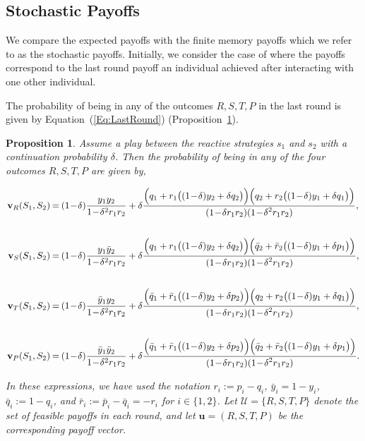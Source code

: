 \documentclass[11pt]{article}
\theoremstyle{plainCl1}
\newtheorem{Prop}{Proposition}
\theoremstyle{plainCl2}
\begin{document}
\subsection*{Stochastic Payoffs}

We compare the expected payoffs with the finite memory payoffs which we refer to
as the stochastic payoffs. Initially, we consider the case of where the payoffs
correspond to the last round payoff an individual achieved after interacting
with one other individual.

The probability of being in any of the outcomes \(R, S, T, P\) in the last round
is given by Equation~(\ref{Eq:LastRound})
(Proposition~\ref{proposition:last_round}).

\begin{Prop}\label{proposition:last_round}
Assume a play between the reactive strategies \(s_1\) and \(s_2\) with a
continuation probability \(\delta\). Then the probability of being in any of the
four outcomes \(R, S, T, P\) are given by,

\begin{equation} \label{Eq:LastRound}
  \setlength{\arraycolsep}{1pt}
  \begin{array}{rcl}

  \mathbf{v}_{R}(S_1,S_2) &= &\displaystyle (1\!-\!\delta)\frac{y_1y_2}{1\!-\!\delta^2 r_1 r_2}+\delta \frac{\Big(q_1+r_1\big((1\!-\!\delta)y_2+\delta q_2\big)\Big) \Big(q_2+r_2\big((1\!-\!\delta)y_1+\delta q_1\big)\Big)}
  {\displaystyle(1\!-\!\delta r_1r_2)(1\!-\!\delta^2 r_1 r_2)},\\[1cm]

  \mathbf{v}_{S}(S_1,S_2) &= &\displaystyle (1\!-\!\delta)\frac{y_1\bar{y}_2}{1\!-\!\delta^2 r_1 r_2}+\delta \frac{\Big(q_1+r_1\big((1\!-\!\delta)y_2+\delta q_2\big)\Big) \Big(\bar{q}_2+\bar{r}_2\big((1\!-\!\delta)y_1+\delta p_1\big)\Big)}
  {\displaystyle(1\!-\!\delta r_1r_2)(1\!-\!\delta^2 r_1 r_2)},\\[1cm]

  \mathbf{v}_{T}(S_1,S_2) &= &\displaystyle (1\!-\!\delta)\frac{\bar{y}_1y_2}{1\!-\!\delta^2 r_1 r_2}+\delta \frac{\Big(\bar{q}_1+\bar{r}_1\big((1\!-\!\delta)y_2+\delta p_2\big)\Big) \Big(q_2+r_2\big((1\!-\!\delta)y_1+\delta q_1\big)\Big)}
  {\displaystyle(1\!-\!\delta r_1r_2)(1\!-\!\delta^2 r_1 r_2)},\\[1cm]

  \mathbf{v}_{P}(S_1,S_2) &= &\displaystyle (1\!-\!\delta)\frac{\bar{y}_1\bar{y}_2}{1\!-\!\delta^2 r_1 r_2}+\delta \frac{\Big(\bar{q}_1+\bar{r}_1\big((1\!-\!\delta)y_2+\delta p_2\big)\Big) \Big(\bar{q}_2+\bar{r}_2\big((1\!-\!\delta)y_1+\delta p_1\big)\Big)}
  {\displaystyle(1\!-\!\delta r_1r_2)(1\!-\!\delta^2 r_1 r_2)}.
  \end{array}
\end{equation}

In these expressions, we have used
the notation $r_i:=p_i\!-\!q_i$, $\bar{y}_i\!=\!1\!-\!y_i$, $\bar{q}_i:=1\!-\!q_i$,
and $\bar{r}_i:=\bar{p}_i\!-\!\bar{q}_i=-r_i$ for $i\!\in\!\{1,2\}$.
Let $\mathcal{U}=\{R,S,T,P\}$ denote the set of feasible payoffs in each round,
and let $\mathbf{u}\!=\!(R,S,T,P)$ be the corresponding payoff vector.
\end{Prop}
\end{document}
